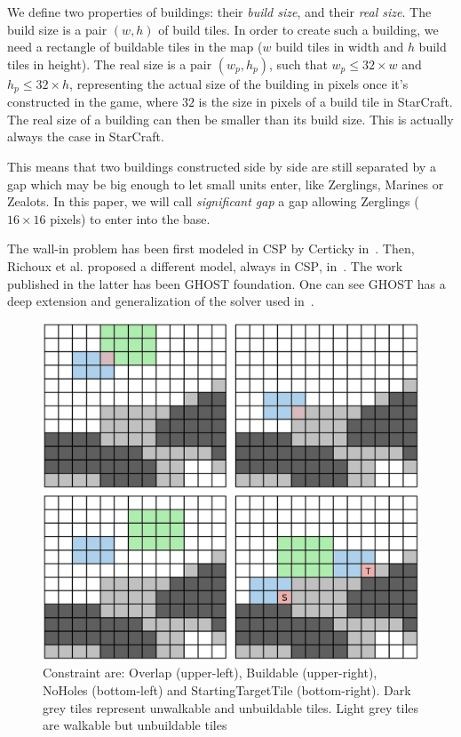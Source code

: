 \documentclass[journal]{IEEEtran}
\newcommand{\csp}{\textsc{CSP}\xspace}
\newcommand{\ghost}{\textsc{GHOST}\xspace}
\begin{document}
We define  two properties  of buildings: their  {\em build  size}, and
their {\em  real size}.  The  build size is a  pair $(w, h)$  of build
tiles. In  order to  create such  a building, we  need a  rectangle of
buildable tiles  in the map  ($w$ build tiles  in width and  $h$ build
tiles in height). The real size is a pair $(w_p, h_p)$, such that $w_p
\leq 32 \times w$ and $h_p  \leq 32 \times h$, representing the actual
size of  the building  in pixels  once it's  constructed in  the game,
where $32$  is the size  in pixels of a  build tile in  StarCraft. The
real size of a building can then  be smaller than its build size. This
is actually always the case in StarCraft.

This  means that  two buildings  constructed  side by  side are  still
separated by a gap  which may be big enough to  let small units enter,
like Zerglings, Marines  or Zealots. In this paper, we  will call {\it
  significant gap} a gap allowing Zerglings ($16 \times 16$ pixels) to
enter into the base.

The  wall-in  problem has  been  first  modeled  in \csp  by  Certicky
in~\cite{Certicky13}. Then, Richoux et al. proposed a different model,
always  in \csp,  in~\cite{RichouxUO14}.   The work  published in  the
latter has  been \ghost  foundation.  One  can see  \ghost has  a deep
extension and generalization of the solver used in~\cite{RichouxUO14}.

\begin{figure}[htb]
  \centering
  \includegraphics[width=\columnwidth]{figs/all_constraints.png}
  \caption{Constraint    are:    Overlap    (upper-left),    Buildable
    (upper-right),   NoHoles   (bottom-left)  and   StartingTargetTile
    (bottom-right).    Dark  grey   tiles  represent   unwalkable  and
    unbuildable tiles.  Light grey  tiles are walkable but unbuildable
    tiles}
  \label{fig:wall_constraint}
\end{figure}
\end{document}
